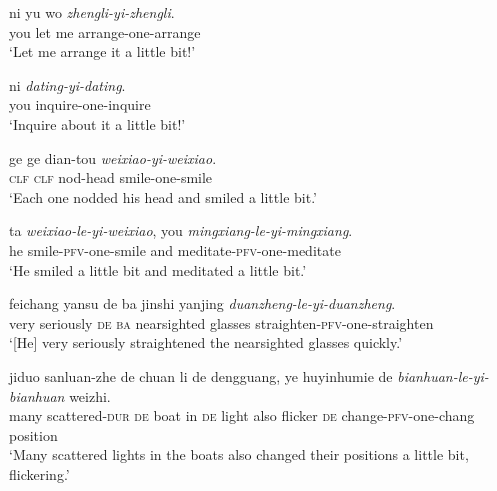 \settowidth{}


\begin{sloppypar}
\ea\label{ex:ABleyiAB}
\ea\label{ex:AByiAB-lu}
\gll ni yu wo \textit{zhengli-yi-zhengli}.\footnotemark\\
you let me arrange-one-arrange\\
\glt `Let me arrange it a little bit!'

\ex\label{ex:AByiAB-pu}
\gll ni \textit{dating-yi-dating}.\footnotemark\\
you inquire-one-inquire\\
\glt `Inquire about it a little bit!'

\ex\label{ex:AByiAB-rou1}
\gll ge ge dian-tou \textit{weixiao-yi-weixiao}.\footnotemark\\
\textsc{clf} \textsc{clf} nod-head smile-one-smile\\
\glt `Each one nodded his head and smiled a little bit.'

\ex\label{ex:AByiAB-rou2}
\gll ta \textit{weixiao-le-yi-weixiao}, you \textit{mingxiang-le-yi-mingxiang}.\footnotemark\\
he smile-\textsc{pfv}-one-smile and meditate-\textsc{pfv}-one-meditate\\
\glt `He smiled a little bit and meditated a little bit.'

\ex\label{ex:AByiAB-li}
\gll feichang yansu de ba jinshi yanjing \textit{duanzheng-le-yi-duanzheng}.\footnotemark\\
very seriously \textsc{de} \textsc{ba} nearsighted glasses straighten-\textsc{pfv}-one-straighten\\
\glt `[He] very seriously straightened the nearsighted glasses quickly.'

\ex\label{ex:ABleyiAB-ccl}
\gll jiduo sanluan-zhe de chuan li de dengguang, ye huyinhumie de \textit{bianhuan-le-yi-bianhuan} weizhi.\\
many scattered-\textsc{dur} \textsc{de} boat in \textsc{de} light also flicker \textsc{de} change-\textsc{pfv}-one-chang position\\ 
\glt `Many scattered lights in the boats also changed their positions a little bit, flickering.'
\z
\z
\end{sloppypar}


